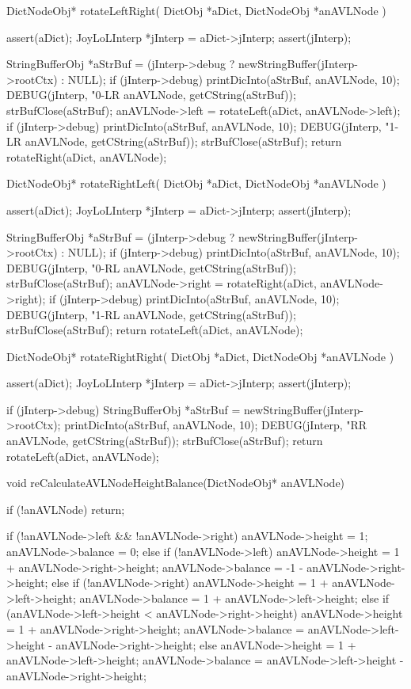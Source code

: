 DictNodeObj* rotateLeftRight(
  DictObj     *aDict,
  DictNodeObj *anAVLNode
) {
  assert(aDict);
  JoyLoLInterp *jInterp = aDict->jInterp;
  assert(jInterp);
 
  StringBufferObj *aStrBuf =
    (jInterp->debug ? newStringBuffer(jInterp->rootCtx) : NULL);
  if (jInterp->debug) {
    printDicInto(aStrBuf, anAVLNode, 10);
    DEBUG(jInterp, "0-LR %
      anAVLNode, getCString(aStrBuf));
    strBufClose(aStrBuf);
  }
  anAVLNode->left = rotateLeft(aDict, anAVLNode->left);
  if (jInterp->debug) {
    printDicInto(aStrBuf, anAVLNode, 10);
    DEBUG(jInterp, "1-LR %
      anAVLNode, getCString(aStrBuf));
    strBufClose(aStrBuf);
  }
  return rotateRight(aDict, anAVLNode);
}
DictNodeObj* rotateRightLeft(
  DictObj     *aDict,
  DictNodeObj *anAVLNode
) {
  assert(aDict);
  JoyLoLInterp *jInterp = aDict->jInterp;
  assert(jInterp);
 
  StringBufferObj *aStrBuf =
    (jInterp->debug ? newStringBuffer(jInterp->rootCtx) : NULL);
  if (jInterp->debug) {
    printDicInto(aStrBuf, anAVLNode, 10);
    DEBUG(jInterp, "0-RL %
      anAVLNode, getCString(aStrBuf));
    strBufClose(aStrBuf);
  }
  anAVLNode->right = rotateRight(aDict, anAVLNode->right);
  if (jInterp->debug) {
    printDicInto(aStrBuf, anAVLNode, 10);
    DEBUG(jInterp, "1-RL %
      anAVLNode, getCString(aStrBuf));
    strBufClose(aStrBuf);
  }
  return rotateLeft(aDict, anAVLNode);
}

DictNodeObj* rotateRightRight(
  DictObj     *aDict,
  DictNodeObj *anAVLNode
) {
  assert(aDict);
  JoyLoLInterp *jInterp = aDict->jInterp;
  assert(jInterp);
 
  if (jInterp->debug) {
    StringBufferObj *aStrBuf = newStringBuffer(jInterp->rootCtx);
    printDicInto(aStrBuf, anAVLNode, 10);
    DEBUG(jInterp, "RR %
      anAVLNode, getCString(aStrBuf));
    strBufClose(aStrBuf);
  }
  return rotateLeft(aDict, anAVLNode);
}

void reCalculateAVLNodeHeightBalance(DictNodeObj* anAVLNode) {
  if (!anAVLNode) return;

  if (!anAVLNode->left && !anAVLNode->right) {
    anAVLNode->height  = 1;
    anAVLNode->balance = 0;
  } else if (!anAVLNode->left) {
    anAVLNode->height  =  1 + anAVLNode->right->height;
    anAVLNode->balance = -1 - anAVLNode->right->height;
  } else if (!anAVLNode->right) {
    anAVLNode->height  = 1 + anAVLNode->left->height;
    anAVLNode->balance = 1 + anAVLNode->left->height;
  } else if (anAVLNode->left->height < anAVLNode->right->height) {
    anAVLNode->height  = 1 + anAVLNode->right->height;
    anAVLNode->balance = anAVLNode->left->height - anAVLNode->right->height;
  } else {
    anAVLNode->height  = 1 + anAVLNode->left->height;
    anAVLNode->balance = anAVLNode->left->height - anAVLNode->right->height;
  }
}

